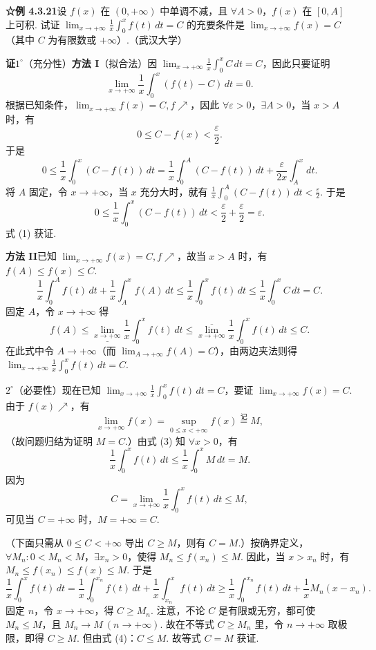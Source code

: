 \documentclass[UTF8,12pt,a4paper,fontset=fandol]{ctexart}
\begin{document}
\noindent\textbf{☆例 4.3.21}\quad 设 $f(x)$ 在 $(0,+\infty)$ 中单调不减，且 $\forall A>0$，$f(x)$ 在 $[0,A]$ 上可积. 试证 $\lim_{x\to+\infty}\frac1x\int_0^x f(t)\,dt=C$ 的充要条件是 $\lim_{x\to+\infty}f(x)=C$（其中 $C$ 为有限数或 $+\infty$）.（武汉大学）

\noindent\textbf{证}\quad $1^\circ$（充分性）\textbf{方法 I}（拟合法）\quad 因 $\lim_{x\to+\infty}\frac1x\int_0^x C\,dt=C$，因此只要证明
\[
\lim_{x\to+\infty}\frac1x\int_0^x(f(t)-C)\,dt=0.
\tag{1}
\]
根据已知条件，$\lim_{x\to+\infty}f(x)=C,f\nearrow$，因此 $\forall\varepsilon>0$，$\exists A>0$，当 $x>A$ 时，有
\[
0\le C-f(x)<\frac{\varepsilon}{2}.
\]
于是
\[
0\le\frac1x\int_0^x(C-f(t))\,dt
=\frac1x\int_0^A(C-f(t))\,dt+\frac{\varepsilon}{2x}\int_A^x dt.
\]
将 $A$ 固定，令 $x\to+\infty$，当 $x$ 充分大时，就有 $\frac1x\int_0^A(C-f(t))\,dt<\frac{\varepsilon}{2}$. 于是
\[
0\le\frac1x\int_0^x(C-f(t))\,dt
<\frac{\varepsilon}{2}+\frac{\varepsilon}{2}=\varepsilon.
\]
式 (1) 获证.

\noindent\textbf{方法 II}\quad 已知 $\lim_{x\to+\infty}f(x)=C,f\nearrow$，故当 $x>A$ 时，有 $f(A)\le f(x)\le C$.
\[
\frac1x\int_0^A f(t)\,dt+\frac1x\int_A^x f(A)\,dt
\le\frac1x\int_0^x f(t)\,dt
\le\frac1x\int_0^x C\,dt=C.
\tag{2}
\]
固定 $A$，令 $x\to+\infty$ 得
\[
f(A)\le\underline{\lim_{x\to+\infty}}\frac1x\int_0^x f(t)\,dt
\le\overline{\lim_{x\to+\infty}}\frac1x\int_0^x f(t)\,dt
\le C.
\]
在此式中令 $A\to+\infty$（而 $\lim_{A\to+\infty}f(A)=C$），由两边夹法则得 $\lim_{x\to+\infty}\frac1x\int_0^x f(t)\,dt=C$.

\noindent $2^\circ$（必要性）现在已知 $\lim_{x\to+\infty}\frac1x\int_0^x f(t)\,dt=C$，要证 $\lim_{x\to+\infty}f(x)=C$. 由于 $f(x)\nearrow$，有
\[
\lim_{x\to+\infty}f(x)=\sup_{0\le x<+\infty} f(x)\stackrel{\text{记}}{=}M,
\tag{3}
\]
（故问题归结为证明 $M=C$.）由式 (3) 知 $\forall x>0$，有
\[
\frac1x\int_0^x f(t)\,dt\le\frac1x\int_0^x M\,dt=M.
\]
因为
\[
C=\lim_{x\to+\infty}\frac1x\int_0^x f(t)\,dt\le M,
\tag{4}
\]
可见当 $C=+\infty$ 时，$M=+\infty=C$.

（下面只需从 $0\le C<+\infty$ 导出 $C\ge M$，则有 $C=M$.）按确界定义，$\forall M_n:0<M_n<M$，$\exists x_n>0$，使得 $M_n\le f(x_n)\le M$. 因此，当 $x>x_n$ 时，有 $M_n\le f(x_n)\le f(x)\le M$. 于是
\[
\frac1x\int_0^x f(t)\,dt
=\frac1x\int_0^{x_n} f(t)\,dt+\frac1x\int_{x_n}^x f(t)\,dt
\ge\frac1x\int_0^{x_n} f(t)\,dt+\frac1x M_n(x-x_n).
\]
固定 $n$，令 $x\to+\infty$，得 $C\ge M_n$. 注意，不论 $C$ 是有限或无穷，都可使 $M_n\le M$，且 $M_n\to M\ (n\to+\infty)$. 故在不等式 $C\ge M_n$ 里，令 $n\to+\infty$ 取极限，即得 $C\ge M$. 但由式 (4)：$C\le M$. 故等式 $C=M$ 获证.
\end{document}
